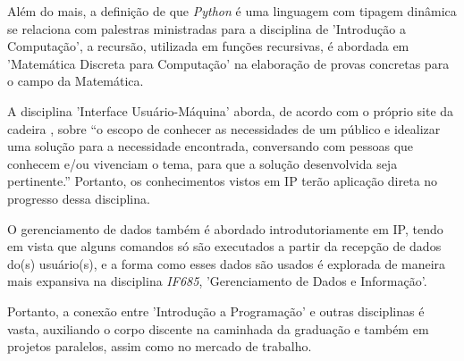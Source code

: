 \documentclass[a4paper, 12pt]{article} %
\begin{document}
Além do mais, a definição de que \textit{Python} é uma linguagem com tipagem dinâmica se relaciona com palestras ministradas para a disciplina de 'Introdução a Computação', a recursão, utilizada em funções recursivas, é abordada em 'Matemática Discreta para Computação' na elaboração de provas concretas para o campo da Matemática. 

A disciplina 'Interface Usuário-Máquina' aborda, de acordo com o próprio site da cadeira \cite{ifm}, sobre “o escopo de conhecer as necessidades de um público e idealizar uma solução para a necessidade encontrada, conversando com pessoas que conhecem e/ou vivenciam o tema, para que a solução desenvolvida seja pertinente.” Portanto, os conhecimentos vistos em IP terão aplicação direta no progresso dessa disciplina. 

O gerenciamento de dados também é abordado introdutoriamente em IP, tendo em vista que alguns comandos só são executados a partir da recepção de dados do(s) usuário(s), e a forma como esses dados são usados é explorada de maneira mais expansiva na disciplina \textit{IF685}, 'Gerenciamento de Dados e Informação'.

Portanto, a conexão entre 'Introdução a Programação' e outras disciplinas é vasta, auxiliando o corpo discente na caminhada da graduação e também em projetos paralelos, assim como no mercado de trabalho.


\newpage


\end{document}

